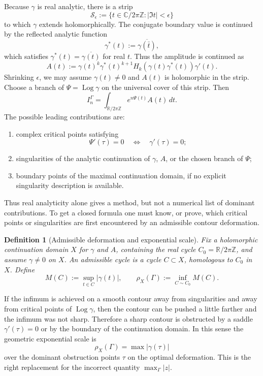 \documentclass[11pt]{article}
\newtheorem{definition}[theorem]{Definition}
\newcommand{\C}{\mathbb C}
\newcommand{\R}{\mathbb R}
\newcommand{\dd}{\,d}
\newcommand{\1}{\mathbf 1}
\newcommand{\Log}{\operatorname{Log}}
\begin{document}
Because \(\gamma\) is real analytic, there is a strip
\[
  \mathcal S_\epsilon:=\{t\in\C/2\pi\mathbb Z:|\Im t|<\epsilon\}
\]
to which \(\gamma\) extends holomorphically. The conjugate boundary value is continued by
the reflected analytic function
\[
  \gamma^*(t):=\overline{\gamma(\bar t)} ,
\]
which satisfies \(\gamma^*(t)=\overline{\gamma(t)}\) for real \(t\). Thus the amplitude is
continued as
\[
  A(t):=\gamma(t)^k\gamma^*(t)^{k+1}
       H_k(\gamma(t)\gamma^*(t))\gamma'(t).
\]
Shrinking \(\epsilon\), we may assume \(\gamma(t)\ne0\) and \(A(t)\) is holomorphic in the
strip. Choose a branch of \(\Psi=\Log\gamma\) on the universal cover of this strip. Then
\[
  I_n^\Gamma=\int_{\R/2\pi\mathbb Z} e^{n\Psi(t)}A(t)\dd t .
\]
The possible leading contributions are:
\begin{enumerate}[label=(\roman*)]
\item complex critical points satisfying
\[
  \Psi'(\tau)=0
  \quad\Longleftrightarrow\quad
  \gamma'(\tau)=0;
\]
\item singularities of the analytic continuation of \(\gamma\), \(A\), or the chosen
branch of \(\Psi\);
\item boundary points of the maximal continuation domain, if no explicit singularity
description is available.
\end{enumerate}
Thus real analyticity alone gives a method, but not a numerical list of dominant
contributions. To get a closed formula one must know, or prove, which critical points or
singularities are first encountered by an admissible contour deformation.

\begin{definition}[Admissible deformation and exponential scale]
Fix a holomorphic continuation domain \(X\) for \(\gamma\) and \(A\), containing the real
cycle \(C_0=\R/2\pi\mathbb Z\), and assume \(\gamma\ne0\) on \(X\). An admissible cycle is a
cycle \(C\subset X\), homologous to \(C_0\) in \(X\). Define
\[
  M(C):=\sup_{t\in C}|\gamma(t)|,
  \qquad
  \rho_X(\Gamma):=\inf_{C\sim C_0}M(C).
\]
\end{definition}

If the infimum is achieved on a smooth contour away from singularities and away from
critical points of \(\Log\gamma\), then the contour can be pushed a little farther and the
infimum was not sharp. Therefore a sharp contour is obstructed by a saddle
\(\gamma'(\tau)=0\) or by the boundary of the continuation domain. In this sense the
geometric exponential scale is
\[
  \rho_X(\Gamma)
  =
  \max |\gamma(\tau)|
\]
over the dominant obstruction points \(\tau\) on the optimal deformation. This is the
right replacement for the incorrect quantity \(\max_{\Gamma}|z|\).
\end{document}
